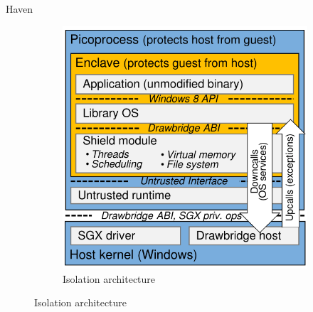 \documentclass[aspectratio=169]{beamer}
\begin{document}
\begin{frame}{Haven}
    \begin{figure}
        \begin{subfigure}[]{0.45\textwidth}
            \includegraphics[width=\textwidth]{images/haven.png}
            \caption{Isolation architecture}
        \end{subfigure}
    \end{figure}
\end{frame}
\end{document}
